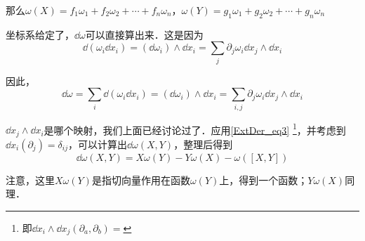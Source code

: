 那么$\omega(X)=f_1\omega_1+f_2\omega_2+\cdots+f_n\omega_n$，$\omega(Y)=g_1\omega_1+g_2\omega_2+\cdots+g_n\omega_n$

坐标系给定了，$\dd \omega$可以直接算出来．这是因为
\begin{equation}
\dd (\omega_i\dd x_i)=(\dd \omega_i)\wedge\dd x_i=\sum_{j}\partial_j\omega_i\dd x_j\wedge\dd x_i
\end{equation}

因此，
\begin{equation}
\dd \omega=\sum_{i}\dd (\omega_i\dd x_i)=(\dd \omega_i)\wedge\dd x_i=\sum_{i, j}\partial_j\omega_i\dd x_j\wedge\dd x_i
\end{equation}

$\dd x_j\wedge\dd x_i$是哪个映射，我们上面已经讨论过了．应用\autoref{ExtDer_eq3} \footnote{即$\dd x_i\wedge \dd x_j(\partial_a, \partial_b)=$}，并考虑到$\dd x_i(\partial _j)=\delta_{ij}$，可以计算出$\dd \omega(X, Y)$，整理后得到
\begin{equation}
\dd \omega(X, Y)=X\omega(Y)-Y\omega(X)-\omega([X, Y])
\end{equation}

注意，这里$X\omega(Y)$是指切向量作用在函数$\omega(Y)$上，得到一个函数；$Y\omega(X)$同理．













